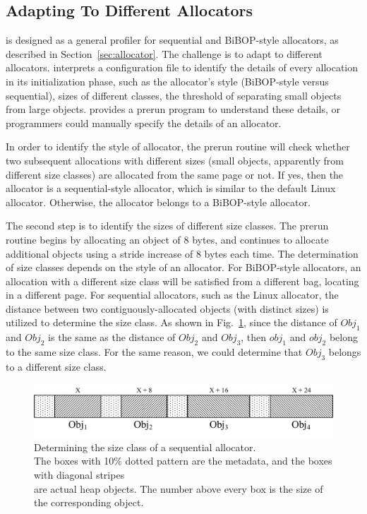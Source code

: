 \subsection{Adapting To Different Allocators}
\label{sec:understandingallocators}

\MP{} is designed as a general profiler for sequential and BiBOP-style allocators, as described in Section~\ref{sec:allocator}. The challenge is to adapt  to different allocators. \MP{} interprets a configuration file to identify the details of every allocation in its initialization phase, such as the allocator's style (BiBOP-style versus sequential), sizes of different classes, the threshold of separating small objects from large objects. \MP{} provides a prerun program to understand these details, or programmers could manually specify the details of an allocator. 

In order to identify the style of allocator, the prerun routine will check whether two subsequent allocations with different sizes (small objects, apparently from different size classes) are allocated from the same page or not. If yes, then the allocator is a sequential-style allocator, which is similar to the default Linux allocator. Otherwise, the allocator belongs to a BiBOP-style allocator. 


The second step is to identify the sizes of different size classes. The prerun routine begins by allocating an object of 8 bytes, and continues to allocate additional objects using a stride increase of 8 bytes each time. The determination of size classes depends on the style of an allocator. For BiBOP-style allocators, an allocation with a different size class will be satisfied from a different bag, locating in a different page. For sequential allocators, such as the Linux allocator, the distance between two contiguously-allocated objects (with distinct sizes) is utilized to determine the size class. As shown in Fig.~\ref{fig:sizeclass}, since the distance of $Obj_1$ and $Obj_2$ is the same as the distance of $Obj_2$ and $Obj_3$, then $obj_1$ and $obj_2$ belong to the same size class. For the same reason, we could determine that $Obj_3$ belongs to a different size class.  

\begin{figure}[!ht]
\centering
\includegraphics[width=5in]{figures/sequentialclasssize}
\caption{Determining the size class of a sequential allocator. \\The boxes with 10\% dotted pattern are the metadata, and the boxes with diagonal stripes\\ are actual heap objects. The number above every box is the size of the corresponding object. \label{fig:sizeclass}}
\end{figure}


